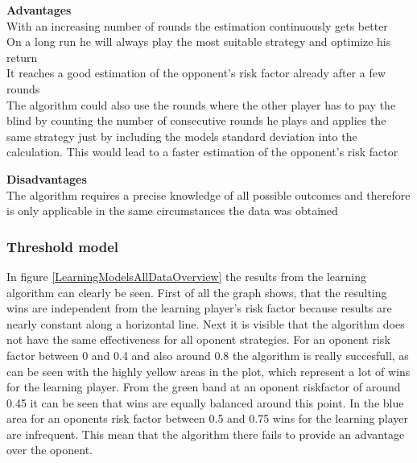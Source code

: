 \documentclass[11pt]{article}
\begin{document}
\begin{minipage}[t]{0.48\textwidth}
\textbf{Advantages}\\
With an increasing number of rounds the estimation continuously gets better\\
On a long run he will always play the most suitable strategy and optimize his return\\
It reaches a good estimation of the opponent's risk factor already after a few rounds\\
The algorithm could also use the rounds where the other player has to pay the blind by counting the number of consecutive rounds he plays and applies the same strategy just by including the models standard deviation into the calculation. This would lead to a faster estimation of the opponent's risk factor
\end{minipage}\hfill
\begin{minipage}[t]{0.48\textwidth}
\textbf{Disadvantages}\\
The algorithm requires a precise knowledge of all possible outcomes and therefore is only applicable in the same circumstances the data was obtained\\
\end{minipage}

\subsubsection{Threshold model}

In figure \ref{LearningModelsAllDataOverview} the results from the learning algorithm can clearly be seen. First of all the graph shows, that the resulting wins are independent from the learning player's risk factor because results are nearly constant along a horizontal line. Next it is visible that the algorithm does not have the same effectiveness for all oponent strategies. For an oponent risk factor between 0 and 0.4 and also around 0.8 the algorithm is really succesfull, as can be seen with the highly yellow areas in the plot, which represent a lot of wins for the learning player. From the green band at an oponent riskfactor of around 0.45 it can be seen that wins are equally balanced around this point. In the blue area for an oponents risk factor between 0.5 and 0.75 wins for the learning player are infrequent. This mean that the algorithm there fails to provide an advantage over the oponent.\\
\end{document}
